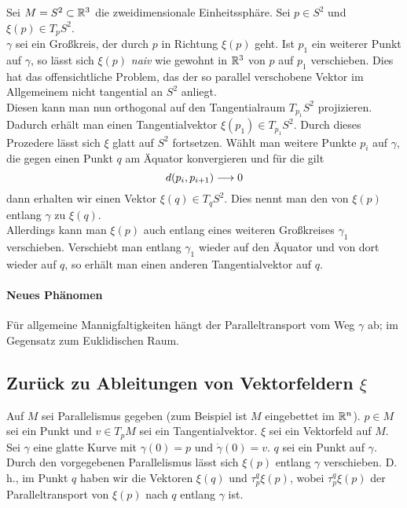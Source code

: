 \Bsp{}
Sei $M = S^2 \subset \mathbb{R}^3$ die zweidimensionale Einheitssphäre. Sei $p \in S^2$ und $\xi(p) \in T_pS^2$.\\
$\gamma$ sei ein Großkreis, der durch $p$ in Richtung $\xi(p)$ geht. Ist $p_1$ ein weiterer Punkt auf $\gamma$, so lässt sich $\xi(p)$ \textsl{naiv} wie gewohnt in $\mathbb{R}^3$ von $p$ auf $p_1$ verschieben. Dies hat das offensichtliche Problem, das der so parallel verschobene Vektor im Allgemeinem nicht tangential an $S^2$ anliegt.\\
Diesen kann man nun orthogonal auf den Tangentialraum $T_{p_1}S^2$ projizieren. Dadurch erhält man einen Tangentialvektor $\xi(p_1) \in T_{p_1}S^2$. Durch dieses Prozedere lässt sich $\xi$ glatt auf $S^2$ fortsetzen. Wählt man weitere Punkte $p_i$ auf $\gamma$, die gegen einen Punkt $q$ am Äquator konvergieren und für die gilt
\[ d(p_i, p_{i+1}) \overset{}{\longrightarrow} 0 \]
dann erhalten wir einen Vektor $\xi(q) \in T_qS^2$. Dies nennt man den  von $\xi(p)$ entlang $\gamma$ zu $\xi(q)$.\\
Allerdings kann man $\xi(p)$ auch entlang eines weiteren Großkreises $\gamma_1$ verschieben. Verschiebt man entlang $\gamma_1$ wieder auf den Äquator und von dort wieder auf $q$, so erhält man einen anderen Tangentialvektor auf $q$.

\paragraph{Neues Phänomen}
Für allgemeine Mannigfaltigkeiten hängt der Paralleltransport vom Weg $\gamma$ ab; im Gegensatz zum Euklidischen Raum.

\subsection{Zurück zu Ableitungen von Vektorfeldern $\xi$}
Auf $M$ sei Parallelismus gegeben (zum Beispiel ist $M$ eingebettet im $\mathbb{R}^n$). $p\in M$ sei ein Punkt und $v \in T_pM$ sei ein Tangentialvektor. $\xi$ sei ein Vektorfeld auf $M$.\\
Sei $\gamma$ eine glatte Kurve mit $\gamma(0) = p$ und $\dot{\gamma} (0) = v$. $q$ sei ein Punkt auf $\gamma$. Durch den vorgegebenen Parallelismus lässt sich $\xi(p)$ entlang $\gamma$ verschieben. D.\,h., im Punkt $q$ haben wir die Vektoren $\xi(q)$ und $\tau^q_p\xi(p)$, wobei $\tau^q_p\xi(p)$ der Paralleltransport von $\xi(p)$ nach $q$ entlang $\gamma$ ist.

